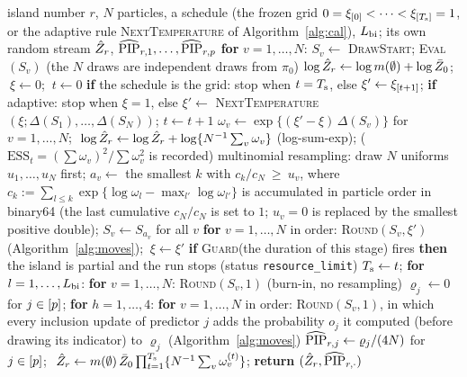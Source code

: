 \begin{algorithm}
\caption{Stage~5: one island (the final run, a diagnostic island or the pilot), the PIP estimator $\PIPhat_{r,j}$ and the evidence estimator $\Zhat_r$.}\label{alg:island}
{\footnotesize
\begin{algorithmic}[1]
\Require island number $r$, $N$ particles, a schedule (the frozen grid $0=\xi_{[0]}<\dots<\xi_{[T_{\mathrm s}]}=1$, or the adaptive rule \textsc{NextTemperature} of Algorithm~\ref{alg:cal}), $L_{\mathrm{bi}}$; its own random stream
\Ensure $\Zhat_r$, $\widehat{\mathrm{PIP}}_{r,1},\dots,\widehat{\mathrm{PIP}}_{r,p}$
\State \textbf{for} $v=1,\dots,N$: $S_v\gets$ \textsc{DrawStart}; \textsc{Eval}$(S_v)$ (the $N$ draws are independent draws from $\pi_0$) %
\State $\log\hat Z_r\gets\log m(\emptyset)+\log\bar Z_0$; $\ \xi\gets0$; $\ t\gets0$ %
\State \textbf{if} the schedule is the grid: stop when $t=T_{\mathrm s}$, else $\xi'\gets\xi_{[t+1]}$; \textbf{if} adaptive: stop when $\xi=1$, else $\xi'\gets$ \textsc{NextTemperature}$(\xi;\Delta(S_1),\dots,\Delta(S_N))$; $t\gets t+1$ %
\State $\omega_v\gets\exp\{(\xi'-\xi)\,\Delta(S_v)\}$ for $v=1,\dots,N$; $\ \log\Zhat_r\gets\log\Zhat_r+\log\{N^{-1}\sum_v\omega_v\}$ (log-sum-exp); ($\mathrm{ESS}_t=(\sum\omega_v)^2/\sum\omega_v^2$ is recorded) %
\State multinomial resampling: draw $N$ uniforms $u_1,\dots,u_N$ first; $a_v\gets$ the smallest $k$ with $c_k/c_N\ \ge\ u_v$, where $c_k:=\sum_{l\le k}\exp\{\log\omega_l-\max_{l'}\log\omega_{l'}\}$ is accumulated in particle order in binary64 (the last cumulative $c_N/c_N$ is set to $1$; $u_v=0$ is replaced by the smallest positive double); $S_v\gets S_{a_v}$ for all $v$ %
\State \textbf{for} $v=1,\dots,N$ in order: \textsc{Round}$(S_v,\xi')$ (Algorithm~\ref{alg:moves}); $\ \xi\gets\xi'$ %
\State \textbf{if} \textsc{Guard}(the duration of this stage) fires \textbf{then} the island is partial and the run stops (status \texttt{resource\_limit}) %
\EndWhile
\State $T_{\mathrm s}\gets t$; \textbf{for} $l=1,\dots,L_{\mathrm{bi}}$: \textbf{for} $v=1,\dots,N$: \textsc{Round}$(S_v,1)$ (burn-in, no resampling) %
\State $\varrho_j\gets0$ for $j\in[p]$; \textbf{for} $h=1,\dots,4$: \textbf{for} $v=1,\dots,N$ in order: \textsc{Round}$(S_v,1)$, in which every inclusion update of predictor $j$ adds the probability $o_j$ it computed (before drawing its indicator) to $\varrho_j$ (Algorithm~\ref{alg:moves}) %
\State $\widehat{\mathrm{PIP}}_{r,j}\gets\varrho_j/(4N)$ for $j\in[p]$; $\ \Zhat_r\gets m(\emptyset)\,\bar Z_0\prod_{t=1}^{\Ts}\{N^{-1}\sum_v\omega^{(t)}_v\}$; \textbf{return} $(\hat Z_r,\widehat{\mathrm{PIP}}_{r,\cdot})$ %
\EndProcedure
\end{algorithmic}}
\end{algorithm}

